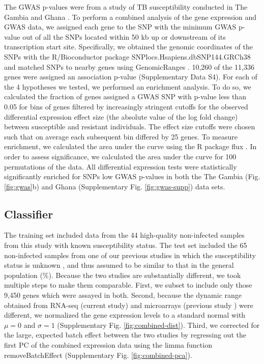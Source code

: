 \documentclass[fleqn,10pt]{wlscirep}
\begin{document}
The GWAS p-values were from a study of TB susceptibility conducted in
The Gambia and Ghana \cite{Thye2010}. To perform a combined analysis
of the gene expression and GWAS data, we assigned each gene to the SNP
with the minimum GWAS p-value out of all the SNPs located within 50 kb
up or downstream of its transcription start site. Specifically, we
obtained the genomic coordinates of the SNPs with the R/Bioconductor
\cite{Huber2015} package SNPlocs.Hsapiens.dbSNP144.GRCh38 and matched
SNPs to nearby genes using GenomicRanges \cite{Lawrence2013}. 10,260
of the 11,336 genes were assigned an association p-value
(Supplementary Data S4). For each of the 4 hypotheses we tested, we
performed an enrichment analysis. To do so, we calculated the fraction
of genes assigned a GWAS SNP with p-value less than 0.05 for bins of
genes filtered by increasingly stringent cutoffs for the observed
differential expression effect size (the absolute value of the log
fold change) between susceptible and resistant individuals. The effect
size cutoffs were chosen such that on average each subsequent bin
differed by 25 genes. To measure enrichment, we calculated the area
under the curve using the R package flux \cite{Jurasinski2014}. In
order to assess significance, we calculated the area under the curve
for 100 permutations of the data. All differential expression tests
were statistically significantly enriched for SNPs low GWAS p-values
in both the The Gambia (Fig. \ref{fig:gwas}b) and Ghana (Supplementary
Fig. \ref{fig:gwas-supp}) data sets.
\subsection*{Classifier}

The training set included data from the 44 high-quality non-infected
samples from this study with known susceptibility status. The test set
included the 65 non-infected samples from one of our previous studies
in which the susceptibility status is unknown \cite{Barreiro2012}, and
thus assumed to be similar to that in the general population
(\%). Because the two studies are substantially
different, we took multiple steps to make them comparable. First, we
subset to include only those 9,450 genes which were assayed in both.
Second, because the dynamic range obtained from RNA-seq (current
study) and microarrays (previous study \cite{Barreiro2012}) were
different, we normalized the gene expression levels to a standard
normal with $\mu = 0$ and $\sigma = 1$ (Supplementary Fig.
\ref{fig:combined-dist}). Third, we corrected for the large, expected
batch effect between the two studies by regressing out the first PC of
the combined expression data using the limma function
removeBatchEffect \cite{Ritchie2015} (Supplementary Fig.
\ref{fig:combined-pca}).
\end{document}
